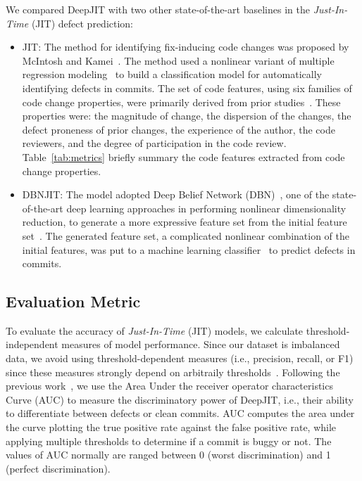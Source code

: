 We compared DeepJIT with two other state-of-the-art baselines in the \emph{Just-In-Time} (JIT) defect prediction:
\begin{itemize}
\item JIT: The method for identifying fix-inducing code changes was proposed by McIntosh and Kamei~\cite{mcintosh2018fix}. The method used a nonlinear variant of multiple regression modeling~\cite{fox1997applied} to build a classification model for automatically identifying defects in commits. The set of code features, using six families of code change properties, were primarily derived from prior studies~\cite{Kamei:2013:LES, Kim:2008:CSC, Kononenko:2015, Mockus2000}. These properties were: the magnitude of change, the dispersion of the changes, the defect proneness of prior changes, the experience of the author, the code reviewers, and the degree of participation in the code review. Table~\ref{tab:metrics} briefly summary the code features extracted from code change properties.
\item DBNJIT: The model adopted Deep Belief Network (DBN)~\cite{hinton2006reducing}, one of the state-of-the-art deep learning approaches in performing nonlinear dimensionality reduction, to generate a more expressive feature set from the initial feature set~\cite{Yang:2015:DLJ}. The generated feature set, a complicated nonlinear combination of the initial features, was put to a machine learning classifier~\cite{nasrabadi2007pattern} to predict defects in commits. 
\end{itemize}

\subsection{Evaluation Metric}
\label{sec:metric}
To evaluate the accuracy of \emph{Just-In-Time} (JIT) models, we calculate  threshold-independent measures of model performance. Since our dataset is imbalanced data, we avoid using threshold-dependent measures (i.e., precision, recall, or F1) since these measures strongly depend on arbitraily thresholds~\cite{nguyen2009learning, gu2008data}. Following the previous work~\cite{mcintosh2018fix},  we use the Area Under the receiver operator characteristics
Curve (AUC) to measure the discriminatory power of DeepJIT, i.e., their ability to differentiate between defects or clean commits. AUC computes the area under the curve plotting the true positive rate against the false positive rate, while applying multiple thresholds to determine if a commit is buggy or not. The values of AUC normally are ranged between 0 (worst discrimination) and 1 (perfect discrimination).

